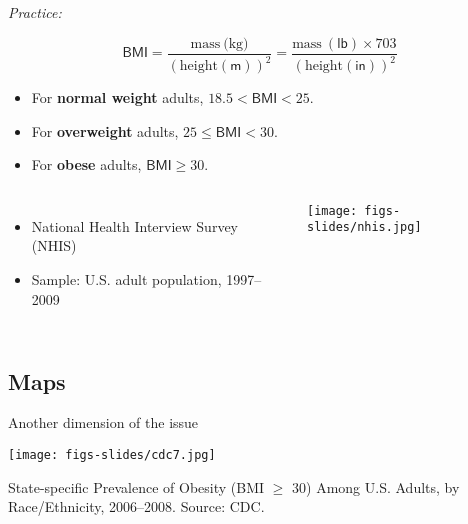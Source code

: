 \documentclass{beamer}
\begin{document}
	\begin{frame}[t]{\textit{Practice:} }

		$$\mathsf{BMI} = \frac{\mbox{mass} \ \mbox{(kg)}}{\left( \mbox{height}(\mathsf{m})\right)^2} = \frac{\mbox{mass} \ \mathsf{(lb)} \times 703}{\left(\mbox{height} (\mathsf{in})\right)^2}$$

		\begin{itemize}
			\item For \textbf{normal weight} adults, $18.5 < \mathsf{BMI} < 25$.

			\item For \textbf{overweight} adults, $25 \leq \mathsf{BMI} < 30$.
			
			\item For \textbf{obese }adults, $\mathsf{BMI} \geq 30$.
						
		\end{itemize}

		\begin{columns}[T]
			
			\begin{itemize}
				\item National Health Interview Survey (NHIS)
				\item Sample: U.S. adult population, 1997--2009
			\end{itemize}

			\texttt{[image: figs-slides/nhis.jpg]}
		\end{columns}
		
	\end{frame}

	\subsection{Maps}
	
	
	\begin{frame}[t]{Another dimension of the issue}
		\begin{center}
		\texttt{[image: figs-slides/cdc7.jpg]}\\		
		\end{center}
		\vspace{0.5em}
		State-specific Prevalence of Obesity (BMI $\geq$ 30) Among U.S. Adults, by Race/Ethnicity, 2006--2008. Source: CDC.
	\end{frame}
	
\end{document}
